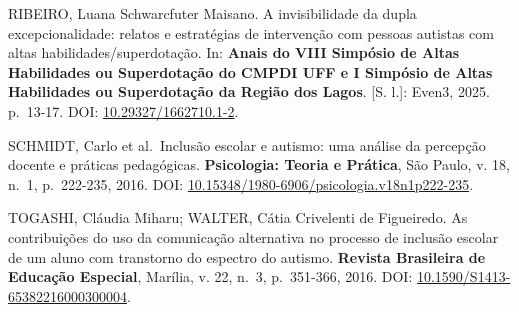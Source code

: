 RIBEIRO, Luana Schwarcfuter Maisano. A invisibilidade da dupla
excepcionalidade: relatos e estratégias de intervenção com pessoas
autistas com altas habilidades/superdotação. In: \textbf{Anais do VIII
Simpósio de Altas Habilidades ou Superdotação do CMPDI UFF e I Simpósio
de Altas Habilidades ou Superdotação da Região dos Lagos}. {[}S. l.{]}:
Even3, 2025. p.~13-17. DOI: \url{10.29327/1662710.1-2}.

SCHMIDT, Carlo et al.~Inclusão escolar e autismo: uma análise da
percepção docente e práticas pedagógicas. \textbf{Psicologia: Teoria e
Prática}, São Paulo, v. 18, n.~1, p.~222-235, 2016. DOI:
\url{10.15348/1980-6906/psicologia.v18n1p222-235}.

TOGASHI, Cláudia Miharu; WALTER, Cátia Crivelenti de Figueiredo. As
contribuições do uso da comunicação alternativa no processo de inclusão
escolar de um aluno com transtorno do espectro do autismo.
\textbf{Revista Brasileira de Educação Especial}, Marília, v. 22, n.~3,
p.~351-366, 2016. DOI: \url{10.1590/S1413-65382216000300004}.
